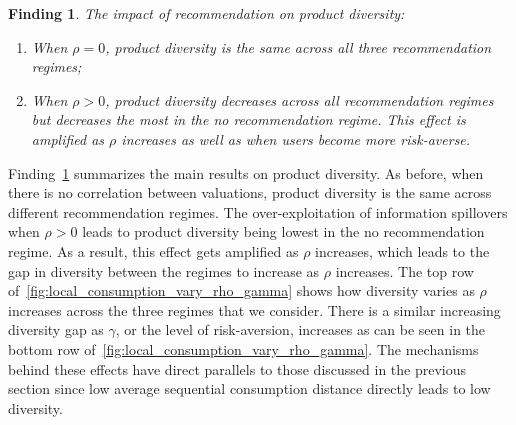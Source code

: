 \documentclass[manuscript]{acmart}
\newtheorem{finding}{Finding}
\begin{document}
\begin{finding}\label{finding_diversity}
The impact of recommendation on product diversity:
\begin{enumerate}
\item When $\rho = 0$, product diversity is the same across all three recommendation regimes;
\item When $\rho > 0$, product diversity decreases across all recommendation regimes but decreases the most in the no recommendation regime. This effect is amplified as $\rho$ increases as well as when users become more risk-averse.
\end{enumerate}
\end{finding}
\par 
Finding~\ref{finding_diversity} summarizes the main results on product diversity. As before, when there is no correlation between valuations, product diversity is the same across different recommendation regimes. The over-exploitation of information spillovers when $\rho > 0$ leads to product diversity being lowest in the no recommendation regime. As a result, this effect gets amplified as $\rho$ increases, which leads to the gap in diversity between the regimes to increase as $\rho$ increases. The top row of~\autoref{fig:local_consumption_vary_rho_gamma} shows how diversity varies as $\rho$ increases across the three regimes that we consider. There is a similar increasing diversity gap as $\gamma$, or the level of risk-aversion, increases as can be seen in the bottom row of~\autoref{fig:local_consumption_vary_rho_gamma}. The mechanisms behind these effects have direct parallels to those discussed in the previous section since low average sequential consumption distance directly leads to low diversity.
\par 
\end{document}
